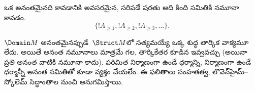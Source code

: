 \documentclass[../../../include/open-logic-section]{subfiles}
\begin{document}
\begin{prop}
ఒక  అనంతమైనది కావడానికి అవసరమైన, సరిపడే షరతు అది కింది సమితికి నమూనా కావడం.
\[
\{!A_{\ge 1}, !A_{\ge 2}, !A_{\ge 3}, \dots \}.
\]
\end{prop}

$\Domain M$ అనంతమైనప్పుడే~$\Struct M$లో సత్యమయ్యే ఒక్క శుద్ధ తార్కిక
వాక్యమూ లేదు. అయితే అనంత నమూనాలు మాత్రమే గల, తార్కికేతర
 కూడిన  ఇవ్వవచ్చు (అయినా ప్రతి అనంత
 వాటికి నమూనా కాదు). పరిమిత నిర్మాణంగా ఉండే ధర్మాన్ని,
 నిర్మాణంగా ఉండే ధర్మాన్నీ అనంత 
సమితితో కూడా వ్యక్తం చేయలేం. ఈ ఫలితాలు సంహతత్వ, లొవెన్‌హైమ్--స్కోలెమ్
సిద్ధాంతాల నుంచి అనుగమిస్తాయి.
\end{document}
